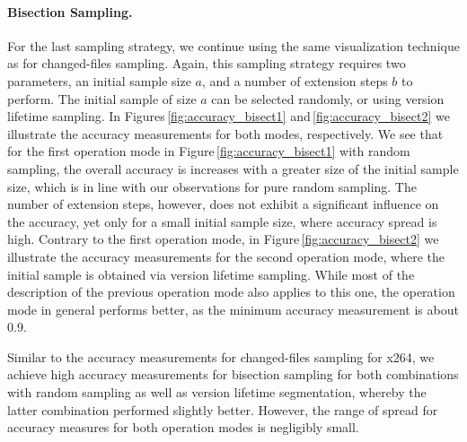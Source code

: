 \paragraph{Bisection Sampling.} 
For the last sampling strategy, we continue using the same visualization
technique as for changed-files sampling. Again, this sampling strategy requires
two parameters, an initial sample size $a$, and a number of extension steps $b$
to perform. The initial sample of size $a$ can be selected randomly, or using
version lifetime sampling. In Figures\,\ref{fig:accuracy_bisect1}
and\,\ref{fig:accuracy_bisect2} we illustrate the accuracy measurements for both modes, respectively. We see that for the first operation
mode in Figure\,\ref{fig:accuracy_bisect1} with random sampling, the overall
accuracy is increases with a greater size of the initial sample size, which is in line with our
observations for pure random sampling. The number of extension steps, however,
does not exhibit a significant influence on the accuracy, yet only for a small
initial sample size, where accuracy spread is high. Contrary to the first
operation mode, in Figure\,\ref{fig:accuracy_bisect2} we illustrate the accuracy
measurements for the second operation mode, where the initial sample is obtained via version
lifetime sampling. While most of the description of the previous operation mode
also applies to this one, the operation mode in general performs better, as the
minimum accuracy measurement is about 0.9.

Similar to the accuracy measurements for changed-files sampling for x264, we
achieve high accuracy measurements for bisection sampling for both combinations
with random sampling as well as version lifetime segmentation, whereby the
latter combination performed slightly better. However, the range of spread for
accuracy measures for both operation modes is negligibly small.

